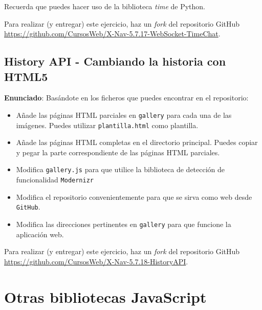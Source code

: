 Recuerda que puedes hacer uso de la biblioteca \emph{time} de Python.

Para realizar (y entregar) este ejercicio, haz un \emph{fork} del repositorio GitHub \url{https://github.com/CursosWeb/X-Nav-5.7.17-WebSocket-TimeChat}.


\subsection{History API - Cambiando la historia con HTML5}
\label{subsec:cambiando-historia}

\textbf{Enunciado}: Basándote en los ficheros que puedes encontrar en el repositorio:

\begin{itemize}
  \item Añade las páginas HTML parciales en \texttt{gallery} para cada una de las imágenes. Puedes utilizar \texttt{plantilla.html} como plantilla.
  \item Añade las páginas HTML completas en el directorio principal. Puedes copiar y pegar la parte correspondiente de las páginas HTML parciales.
    \item Modifica \texttt{gallery.js} para que utilice la biblioteca de detección de funcionalidad \texttt{Modernizr}
    \item Modifica el repositorio convenientemente para que se sirva como web desde \texttt{GitHub}.
    \item Modifica las direcciones pertinentes en \texttt{gallery} para que funcione la aplicación web.
\end{itemize}

Para realizar (y entregar) este ejercicio, haz un \emph{fork} del repositorio GitHub \url{https://github.com/CursosWeb/X-Nav-5.7.18-HistoryAPI}.


\section{Otras bibliotecas JavaScript}

